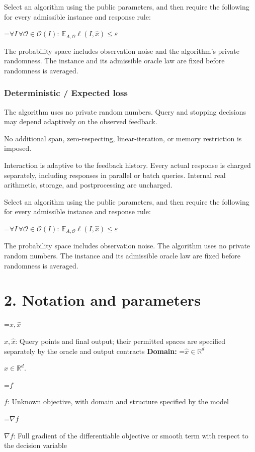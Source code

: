 \documentclass[10pt,a4paper]{article}
\newcommand{\AtlasMath}[1]{\par\begingroup\centering\setbox0=\hbox{$\displaystyle #1$}\ifdim\wd0>1.4\linewidth\typeout{ATLAS WIDE FORMULA: \the\wd0}\fi\ifdim\wd0>\linewidth\resizebox{\linewidth}{!}{\box0}\else\box0\fi\par\endgroup}
\newcommand{\AtlasInlineMath}[1]{\begingroup\setbox0=\hbox{$#1$}\ifdim\wd0>.4\linewidth\endgroup\AtlasMath{#1}\else\endgroup$#1$\fi}
\begin{document}
Select an algorithm using the public parameters, and then require the following for every admissible instance and response rule:


\AtlasMath{\forall I\,\forall\mathcal{O}\in\mathcal{O}(I):\ \mathbb{E}_{A,\mathcal{O}}\ell(I,\widehat{x})\le\varepsilon}


The probability space includes observation noise and the algorithm's private randomness. The instance and its admissible oracle law are fixed before randomness is averaged.

\subsubsection{Deterministic / Expected loss}
The algorithm uses no private random numbers. Query and stopping decisions may depend adaptively on the observed feedback.

No additional span, zero-respecting, linear-iteration, or memory restriction is imposed.

Interaction is adaptive to the feedback history. Every actual response is charged separately, including responses in parallel or batch queries. Internal real arithmetic, storage, and postprocessing are uncharged.

Select an algorithm using the public parameters, and then require the following for every admissible instance and response rule:


\AtlasMath{\forall I\,\forall\mathcal{O}\in\mathcal{O}(I):\ \mathbb{E}_{A,\mathcal{O}}\ell(I,\widehat{x})\le\varepsilon}


The probability space includes observation noise. The algorithm uses no private random numbers. The instance and its admissible oracle law are fixed before randomness is averaged.

\section{2. Notation and parameters}
\AtlasInlineMath{x,\widehat{x}}: Query points and final output; their permitted spaces are specified separately by the oracle and output contracts \textbf{Domain:} \AtlasInlineMath{\widehat{x}\in \mathbb{R}^d}.

\AtlasInlineMath{f}: Unknown objective, with domain and structure specified by the model

\AtlasInlineMath{\nabla f}: Full gradient of the differentiable objective or smooth term with respect to the decision variable
\end{document}
